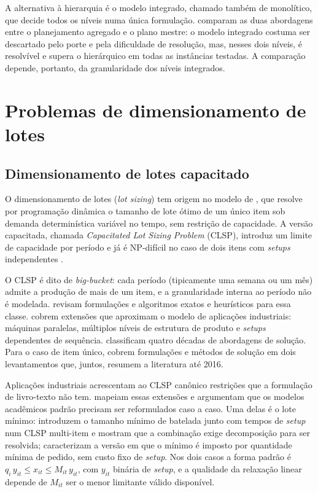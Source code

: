 \documentclass[
    12pt,
    openright,
    oneside,
    a4paper,
    fleqn,
    chapter=TITLE,
    section=TITLE,
    english,
    brazil
]{abntex2}
\begin{document}
A alternativa à hierarquia é o modelo integrado, chamado também de monolítico, que decide todos os níveis numa única formulação.  comparam as duas abordagens entre o planejamento agregado e o plano mestre: o modelo integrado costuma ser descartado pelo porte e pela dificuldade de resolução, mas, nesses dois níveis, é resolvível e supera o hierárquico em todas as instâncias testadas. A comparação depende, portanto, da granularidade dos níveis integrados.

\section{Problemas de dimensionamento de lotes}
\label{sec:problemas_lotsizing}

\subsection{Dimensionamento de lotes capacitado}

O dimensionamento de lotes (\textit{lot sizing}) tem origem no modelo de , que resolve por programação dinâmica o tamanho de lote ótimo de um único item sob demanda determinística variável no tempo, sem restrição de capacidade. A versão capacitada, chamada \textit{Capacitated Lot Sizing Problem} (CLSP), introduz um limite de capacidade por período e já é NP-difícil no caso de dois itens com \textit{setups} independentes \cite{bitranyanasse1982,chenthizy1990}.

O CLSP é dito de \textit{big-bucket}: cada período (tipicamente uma semana ou um mês) admite a produção de mais de um item, e a granularidade interna ao período não é modelada.  revisam formulações e algoritmos exatos e heurísticos para essa classe.  cobrem extensões que aproximam o modelo de aplicações industriais: máquinas paralelas, múltiplos níveis de estrutura de produto e \textit{setups} dependentes de sequência.  classificam quatro décadas de abordagens de solução. Para o caso de item único,  cobrem formulações e métodos de solução em dois levantamentos que, juntos, resumem a literatura até 2016.

Aplicações industriais acrescentam ao CLSP canônico restrições que a formulação de livro-texto não tem.  mapeiam essas extensões e argumentam que os modelos acadêmicos padrão precisam ser reformulados caso a caso. Uma delas é o lote mínimo:  introduzem o tamanho mínimo de batelada junto com tempos de \textit{setup} num CLSP multi-item e mostram que a combinação exige decomposição para ser resolvida;  caracterizam a versão em que o mínimo é imposto por quantidade mínima de pedido, sem custo fixo de \textit{setup}. Nos dois casos a forma padrão é $q_i\,y_{it} \le x_{it} \le M_{it}\,y_{it}$, com $y_{it}$ binária de \textit{setup}, e a qualidade da relaxação linear depende de $M_{it}$ ser o menor limitante válido disponível.
\end{document}
